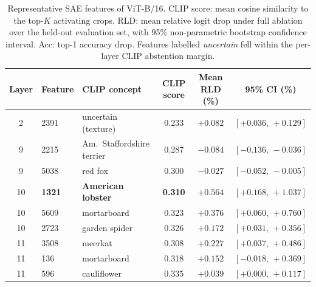 
\begin{table}[t]
  \centering
  \footnotesize
  \caption{Representative SAE features of ViT-B/16. CLIP score: mean cosine similarity to the top-$K$ activating crops. RLD: mean relative logit drop under full ablation over the held-out evaluation set, with 95\% non-parametric bootstrap confidence interval. Acc: top-1 accuracy drop. Features labelled \emph{uncertain} fell within the per-layer CLIP abstention margin.}
  \label{tab:feature_results}
  \begin{tabular}{cllccc}
    \toprule
    Layer & Feature & CLIP concept & CLIP score & Mean RLD (\%) & 95\% CI (\%) \\
    \midrule
    2  & 2391 & uncertain (texture)             & 0.233 & $+0.082$ & $[+0.036,\,+0.129]$ \\
    \midrule
    9  & 2215 & Am.\ Staffordshire terrier      & 0.287 & $-0.084$ & $[-0.136,\,-0.036]$ \\
    9  & 5038 & red fox                         & 0.300 & $-0.027$ & $[-0.052,\,-0.005]$ \\
    \midrule
    10 & \textbf{1321} & \textbf{American lobster} & \textbf{0.310} & $\mathbf{+0.564}$ & $\mathbf{[+0.168,\,+1.037]}$ \\
    10 & 5609 & mortarboard                     & 0.323 & $+0.376$ & $[+0.060,\,+0.760]$ \\
    10 & 2723 & garden spider                   & 0.326 & $+0.172$ & $[+0.031,\,+0.356]$ \\
    \midrule
    11 & 3508 & meerkat                         & 0.308 & $+0.227$ & $[+0.037,\,+0.486]$ \\
    11 & 136  & mortarboard                     & 0.318 & $+0.152$ & $[-0.018,\,+0.369]$ \\
    11 & 596  & cauliflower                     & 0.335 & $+0.039$ & $[+0.000,\,+0.117]$ \\
    \bottomrule
  \end{tabular}
\end{table}

